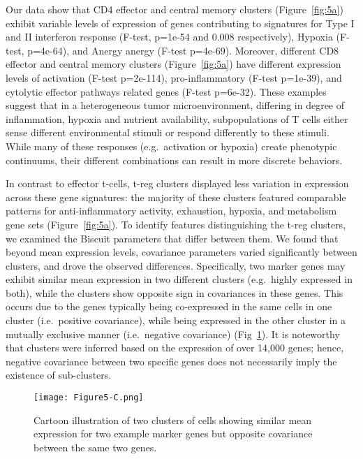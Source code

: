 Our data show that CD4 effector and central memory clusters (Figure~\ref{fig:5a}) exhibit variable levels of expression of genes contributing to signatures for Type I and II interferon response (F-test, p=1e-54 and 0.008 respectively), Hypoxia (F-test, p=4e-64), and Anergy anergy (F-test p=4e-69).
Moreover, different CD8 effector and central memory clusters (Figure~\ref{fig:5a}) have different expression levels of activation (F-test p=2e-114), pro-inflammatory (F-test p=1e-39), and cytolytic effector pathways related genes (F-test p=6e-32).
These examples suggest that in a heterogeneous tumor microenvironment, differing in degree of inflammation, hypoxia and nutrient availability, subpopulations of T cells either sense different environmental stimuli or respond differently to these stimuli.
While many of these responses (e.g.\ activation or hypoxia) create phenotypic continuums, their different combinations can result in more discrete behaviors.

In contrast to effector t-cells, t-reg clusters displayed less variation in expression across these gene signatures: the majority of these clusters featured comparable patterns for anti-inflammatory activity, exhaustion, hypoxia, and metabolism gene sets (Figure~\ref{fig:5a}).
To identify features distinguishing the t-reg clusters, we examined the Biscuit parameters that differ between them.
We found that beyond mean expression levels, covariance parameters varied significantly between clusters, and drove the observed differences.
Specifically, two marker genes may exhibit similar mean expression in two different clusters (e.g.\ highly expressed in both), while the clusters show opposite sign in covariances in these genes.
This occurs due to the genes typically being co-expressed in the same cells in one cluster (i.e.\ positive covariance), while being expressed in the other cluster in a mutually exclusive manner (i.e.\ negative covariance) (Fig~\ref{fig:5c}).
It is noteworthy that clusters were inferred based on the expression of over 14,000 genes; hence, negative covariance between two specific genes does not necessarily imply the existence of sub-clusters.

\begin{figure}
\centering
\texttt{[image: Figure5-C.png]}
\caption{Cartoon illustration of two clusters of cells showing similar mean expression for two example marker genes but opposite covariance between the same two genes.
}
\label{fig:5c}
\end{figure}

